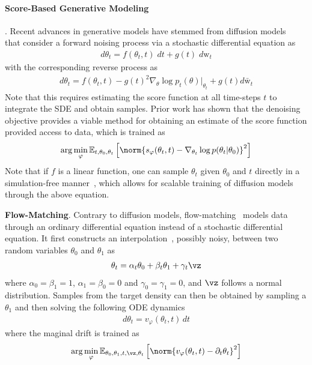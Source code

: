 \paragraph{Score-Based Generative Modeling}. Recent advances in generative models have stemmed from diffusion models~\citep{song2020score,song2020improved,song2020denoising,ho2020denoising,nichol2021improved} that consider a forward noising process via a stochastic differential equation as 
\begin{align}
    d\theta_t = f(\theta_t, t) \;dt + g(t)\;d\text{w}_t
\end{align}
with the corresponding reverse process as~\citep{anderson1982reverse}
\begin{align}
    d\theta_t = f(\theta_t, t) - g(t)^2 \nabla_\theta \log p_t(\theta)|_{\theta_t} + g(t) d\bar{\text{w}}_t
\end{align}
Note that this requires estimating the score function at all time-steps $t$ to integrate the SDE and obtain samples. Prior work has shown that the denoising objective provides a viable method for obtaining an estimate of the score function provided access to data, which is trained as
\begin{align}
    \arg\min_\varphi \mathbb{E}_{t, \theta_0, \theta_t} \left[
    \norm{s_\varphi(\theta_t, t) - \nabla_{\theta_t} \log p(\theta_t | \theta_0)}^2\right]
\end{align}
Note that if $f$ is a linear function, one can sample $\theta_t$ given $\theta_0$ and $t$ directly in a simulation-free manner~\citep{sarkka2019applied}, which allows for scalable training of diffusion models through the above equation.

\textbf{Flow-Matching}. Contrary to diffusion models, flow-matching~\citep{lipman2022flow,tong2023improving} models data through an ordinary differential equation instead of a stochastic differential equation. It first constructs an interpolation~\citep{albergo2023stochastic,albergo2023dependent}, possibly noisy, between two random variables $\theta_0$ and $\theta_1$ as
\begin{align}
    \theta_t = \alpha_t \theta_0 + \beta_t \theta_1 + \gamma_t \vz
\end{align}
where $\alpha_0 = \beta_1 = 1$, $\alpha_1 = \beta_0 = 0$ and $\gamma_0 = \gamma_1 = 0$, and $\vz$ follows a normal distribution. Samples from the target density can then be obtained by sampling a $\theta_1$ and then solving the following ODE dynamics
\begin{align}
     d\theta_t = v_\varphi(\theta_t, t)\,dt
\end{align}
where the maginal drift is trained as
\begin{align}
    \arg\min_\varphi \mathbb{E}_{\theta_0, \theta_1, t, \vz, \theta_t}\left[\norm{v_\varphi(\theta_t, t) - \partial_t \theta_t}^2\right]
\end{align}

